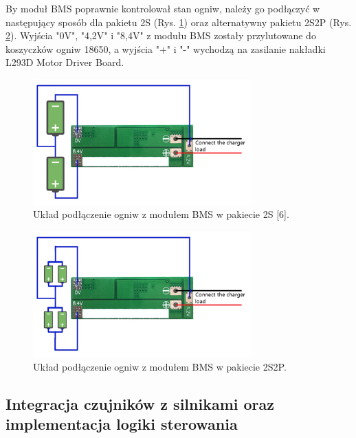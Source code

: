 \documentclass{report}
\begin{document}
By moduł BMS poprawnie kontrolował stan ogniw, należy go podłączyć w następujący sposób dla pakietu 2S (Rys. \ref{fig:BMS-2S-schematic}) oraz alternatywny pakietu 2S2P (Rys. \ref{fig:BMS-2S2P-schematic}). Wyjścia "0V", "4,2V" i "8,4V" z modułu BMS zostały przylutowane do koszyczków ogniw 18650, a wyjścia "+" i "-" wychodzą na zasilanie nakładki L293D Motor Driver Board.

\begin{figure}[H]
    \centering
    \includegraphics[width=0.75\textwidth]{src/cells_charts/BMS 2S schematic.png}
    \caption{Układ podłączenie ogniw z modułem BMS w pakiecie 2S [6].}
    \label{fig:BMS-2S-schematic}
\end{figure}

\begin{figure}[H]
    \centering
    \includegraphics[width=0.75\textwidth]{src/cells_charts/BMS 2S2P schematic.png}
    \caption{Układ podłączenie ogniw z modułem BMS w pakiecie 2S2P.}
    \label{fig:BMS-2S2P-schematic}
\end{figure}

\newpage
\subsection{\Large Integracja czujników z silnikami oraz implementacja logiki sterowania}
%
%
\end{document}
